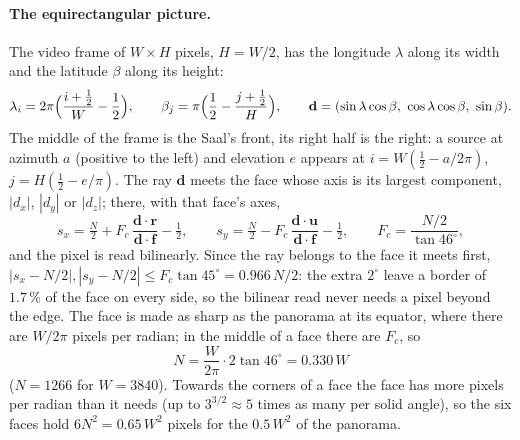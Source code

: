\paragraph{The equirectangular picture.} The video frame of $W\times H$ pixels, $H = W/2$, has the longitude
$\lambda$ along its width and the latitude $\beta$ along its height:
\begin{equation}
  \lambda_i = 2\pi\Bigl(\frac{i+\frac12}{W} - \frac12\Bigr),\qquad
  \beta_j = \pi\Bigl(\frac12 - \frac{j+\frac12}{H}\Bigr),\qquad
  \mathbf d = (\sin\lambda\cos\beta,\ \cos\lambda\cos\beta,\ \sin\beta).
\end{equation}
The middle of the frame is the Saal's front, its right half is the right: a source at azimuth $a$ (positive to the
left) and elevation $e$ appears at $i = W(\frac12 - a/2\pi)$, $j = H(\frac12 - e/\pi)$. The ray $\mathbf d$ meets the
face whose axis is its largest component, $|d_x|$, $|d_y|$ or $|d_z|$; there, with that face's axes,
\begin{equation}
  s_x = \tfrac N2 + F_c\,\frac{\mathbf d\cdot\mathbf r}{\mathbf d\cdot\mathbf f} - \tfrac12,\qquad
  s_y = \tfrac N2 - F_c\,\frac{\mathbf d\cdot\mathbf u}{\mathbf d\cdot\mathbf f} - \tfrac12,\qquad
  F_c = \frac{N/2}{\tan 46^\circ},
\end{equation}
and the pixel is read bilinearly. Since the ray belongs to the face it meets first, $|s_x - N/2|, |s_y - N/2| \le
F_c\tan 45^\circ = 0.966\,N/2$: the extra $2^\circ$ leave a border of $1.7\,\%$ of the face on every side, so the
bilinear read never needs a pixel beyond the edge. The face is made as sharp as the panorama at its equator, where
there are $W/2\pi$ pixels per radian; in the middle of a face there are $F_c$, so
\begin{equation}
  N = \frac{W}{2\pi}\cdot 2\tan 46^\circ = 0.330\,W
\end{equation}
($N = 1266$ for $W = 3840$). Towards the corners of a face the face has more pixels per radian than it needs (up to
$3^{3/2}\approx 5$ times as many per solid angle), so the six faces hold $6N^2 = 0.65\,W^2$ pixels for the $0.5\,W^2$ of
the panorama.

